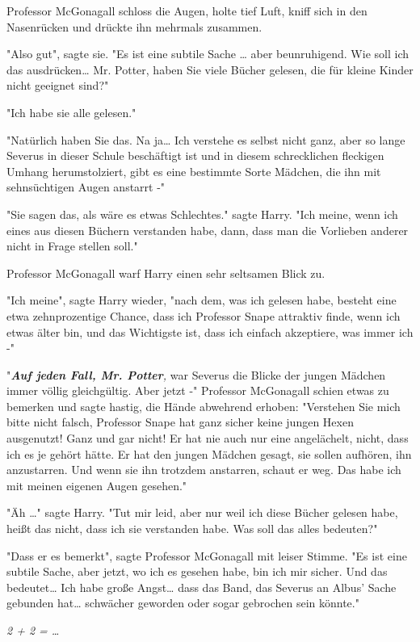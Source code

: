 {Professor McGonagall schloss die Augen, holte tief Luft, kniff sich in den Nasenrücken und drückte ihn mehrmals zusammen.

"Also gut", sagte sie. "Es ist eine subtile Sache … aber beunruhigend. Wie soll ich das ausdrücken… Mr. Potter, haben Sie viele Bücher gelesen, die für kleine Kinder nicht geeignet sind?"

"Ich habe sie alle gelesen."

"Natürlich haben Sie das. Na ja… Ich verstehe es selbst nicht ganz, aber so lange Severus in dieser Schule beschäftigt ist und in diesem schrecklichen fleckigen Umhang herumstolziert, gibt es eine bestimmte Sorte Mädchen, die ihn mit sehnsüchtigen Augen anstarrt -"

"Sie sagen das, als wäre es etwas Schlechtes." sagte Harry. "Ich meine, wenn ich eines aus diesen Büchern verstanden habe, dann, dass man die Vorlieben anderer nicht in Frage stellen soll."

Professor McGonagall warf Harry einen sehr seltsamen Blick zu.

"Ich meine", sagte Harry wieder, "nach dem, was ich gelesen habe, besteht eine etwa zehnprozentige Chance, dass ich Professor Snape attraktiv finde, wenn ich etwas älter bin, und das Wichtigste ist, dass ich einfach akzeptiere, was immer ich -"

"\textbf{\emph{Auf jeden Fall, Mr. Potter}}\emph{,} war Severus die Blicke der jungen Mädchen immer völlig gleichgültig. Aber jetzt -" Professor McGonagall schien etwas zu bemerken und sagte hastig, die Hände abwehrend erhoben: "Verstehen Sie mich bitte nicht falsch, Professor Snape hat ganz sicher keine jungen Hexen ausgenutzt! Ganz und gar nicht! Er hat nie auch nur eine angelächelt, nicht, dass ich es je gehört hätte. Er hat den jungen Mädchen gesagt, sie sollen aufhören, ihn anzustarren. Und wenn sie ihn trotzdem anstarren, schaut er weg. Das habe ich mit meinen eigenen Augen gesehen."

"Äh …" sagte Harry. "Tut mir leid, aber nur weil ich diese Bücher gelesen habe, heißt das nicht, dass ich sie verstanden habe. Was soll das alles bedeuten?"

"Dass er es bemerkt", sagte Professor McGonagall mit leiser Stimme. "Es ist eine subtile Sache, aber jetzt, wo ich es gesehen habe, bin ich mir sicher. Und das bedeutet… Ich habe große Angst… dass das Band, das Severus an Albus' Sache gebunden hat… schwächer geworden oder sogar gebrochen sein könnte."

\emph{2 + 2 = …}

}

